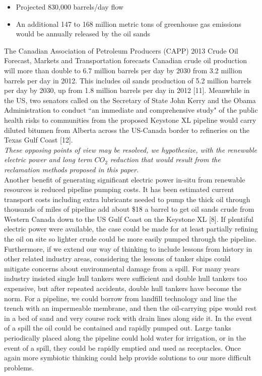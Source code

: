 \documentclass[11pt]{article}
\begin{document}
\begin{itemize}
\item Projected 830,000 barrels/day flow
\item An additional 147 to 168 million metric tons of greenhouse gas emissions would be annually released by the oil sands
\end{itemize}

The Canadian Association of Petroleum Producers (CAPP) 2013 Crude Oil Forecast, Markets and Transportation forecasts Canadian crude oil production will more than double to 6.7 million barrels per day by 2030 from 3.2 million barrels per day in 2012. This includes oil sands production of 5.2 million barrels per day by 2030, up from 1.8 million barrels per day in 2012 [11]. Meanwhile in the US, two senators called on the Secretary of State John Kerry and the Obama Administration to conduct “an immediate and comprehensive study" of the public health risks to communities from the proposed Keystone XL pipeline would carry diluted bitumen from Alberta across the US-Canada border to refineries on the Texas Gulf Coast [12]. \\

\emph{These opposing points of view may be resolved, we hypothesize, with the renewable electric power and long term $CO_2$ reduction that would result from the reclamation methods proposed in this paper.} \\

Another benefit of generating significant electric power in-situ from renewable resources is reduced pipeline pumping costs. It has been estimated current transport costs including extra lubricants needed to pump the thick oil through thousands of miles of pipeline add about \$18 a barrel to get oil sands crude from Western Canada down to the US Gulf Coast on the Keystone XL [8]. If plentiful electric power were available, the case could be made for at least partially refining the oil on site so lighter crude could be more easily pumped through the pipeline. \\

Furthermore, if we extend our way of thinking to include lessons from history in other related industry areas, considering the lessons of tanker ships could mitigate concerns about environmental damage from a spill.  For many years industry insisted single hull tankers were sufficient and double hull tankers too expensive, but after repeated accidents, double hull tankers have become the norm.  For a pipeline, we could borrow from landfill technology and line the trench with an impermeable membrane, and then the oil-carrying pipe would rest in a bed of sand and very course rock with drain lines along side it.  In the event of a spill the oil could be contained and rapidly pumped out.  Large tanks periodically placed along the pipeline could hold water for irrigation, or in the event of a spill, they could be rapidly emptied and used as receptacles.  Once again more symbiotic thinking could help provide solutions to our more difficult problems.
\end{document}
